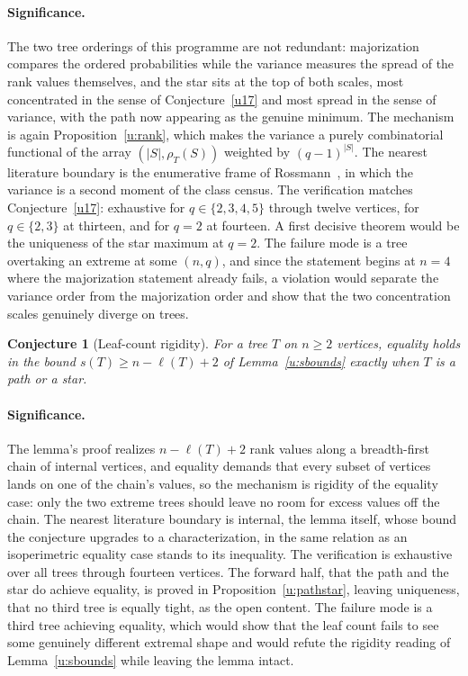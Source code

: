 \documentclass[11pt]{article}
\newtheorem{conjecture}{Conjecture}
\theoremstyle{definition}
\begin{document}
\paragraph{Significance.}
The two tree orderings of this programme are not redundant: majorization compares the ordered probabilities while the variance measures the spread of the rank values themselves, and the star sits at the top of both scales, most concentrated in the sense of Conjecture~\ref{u17} and most spread in the sense of variance, with the path now appearing as the genuine minimum.  The mechanism is again Proposition~\ref{u:rank}, which makes the variance a purely combinatorial functional of the array $(|S|,\rho_T(S))$ weighted by $(q-1)^{|S|}$.  The nearest literature boundary is the enumerative frame of Rossmann~\cite{Ros22}, in which the variance is a second moment of the class census.  The verification matches Conjecture~\ref{u17}: exhaustive for $q\in\{2,3,4,5\}$ through twelve vertices, for $q\in\{2,3\}$ at thirteen, and for $q=2$ at fourteen.  A first decisive theorem would be the uniqueness of the star maximum at $q=2$.  The failure mode is a tree overtaking an extreme at some $(n,q)$, and since the statement begins at $n=4$ where the majorization statement already fails, a violation would separate the variance order from the majorization order and show that the two concentration scales genuinely diverge on trees.


\begin{conjecture}[Leaf-count rigidity]\label{u19}
For a tree $T$ on $n\ge2$ vertices, equality holds in the bound $s(T)\ge n-\ell(T)+2$ of Lemma~\ref{u:sbounds} exactly when $T$ is a path or a star.
\end{conjecture}

\paragraph{Significance.}
The lemma's proof realizes $n-\ell(T)+2$ rank values along a breadth-first chain of internal vertices, and equality demands that every subset of vertices lands on one of the chain's values, so the mechanism is rigidity of the equality case: only the two extreme trees should leave no room for excess values off the chain.  The nearest literature boundary is internal, the lemma itself, whose bound the conjecture upgrades to a characterization, in the same relation as an isoperimetric equality case stands to its inequality.  The verification is exhaustive over all trees through fourteen vertices.  The forward half, that the path and the star do achieve equality, is proved in Proposition~\ref{u:pathstar}, leaving uniqueness, that no third tree is equally tight, as the open content.  The failure mode is a third tree achieving equality, which would show that the leaf count fails to see some genuinely different extremal shape and would refute the rigidity reading of Lemma~\ref{u:sbounds} while leaving the lemma intact.
\end{document}
